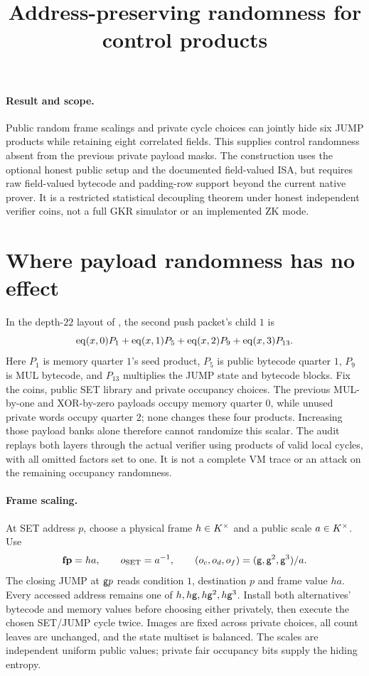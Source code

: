 \documentclass[11pt]{article}
\title{Address-preserving randomness for control products}
\author{}
\date{}
\begin{document}
\maketitle
\vspace{-2em}

\paragraph{Result and scope.} Public random frame scalings and private cycle choices can jointly hide six JUMP products while retaining eight correlated fields. This supplies control randomness absent from the previous private payload masks. The construction uses the optional honest public setup and the documented field-valued ISA, but requires raw field-valued bytecode and padding-row support beyond the current native prover. It is a restricted statistical decoupling theorem under honest independent verifier coins, not a full GKR simulator or an implemented ZK mode.

\section{Where payload randomness has no effect}

In the depth-$22$ layout of , the second push packet's child $1$ is
\[
 \operatorname{eq}(x,0)P_1+\operatorname{eq}(x,1)P_5+\operatorname{eq}(x,2)P_9+\operatorname{eq}(x,3)P_{13}.
\]
Here $P_1$ is memory quarter $1$'s seed product, $P_5$ is public bytecode quarter $1$, $P_9$ is MUL bytecode, and $P_{13}$ multiplies the JUMP state and bytecode blocks. Fix the coins, public SET library and private occupancy choices. The previous MUL-by-one and XOR-by-zero payloads occupy memory quarter $0$, while unused private words occupy quarter $2$; none changes these four products. Increasing those payload banks alone therefore cannot randomize this scalar. The audit replays both layers through the actual verifier using products of valid local cycles, with all omitted factors set to one. It is not a complete VM trace or an attack on the remaining occupancy randomness.

\paragraph{Frame scaling.} At SET address $p$, choose a physical frame $h\in K^\times$ and a public scale $a\in K^\times$. Use
\[
 \mathbf{fp}=ha,\qquad o_{\rm SET}=a^{-1},\qquad
 (o_c,o_d,o_f)=(\mathsf{g},\mathsf{g}^2,\mathsf{g}^3)/a.
\]
The closing JUMP at $\mathsf{g} p$ reads condition $1$, destination $p$ and frame value $ha$. Every accessed address remains one of $h,h\mathsf{g},h\mathsf{g}^2,h\mathsf{g}^3$. Install both alternatives' bytecode and memory values before choosing either privately, then execute the chosen SET/JUMP cycle twice. Images are fixed across private choices, all count leaves are unchanged, and the state multiset is balanced. The scales are independent uniform public values; private fair occupancy bits supply the hiding entropy.
\end{document}
